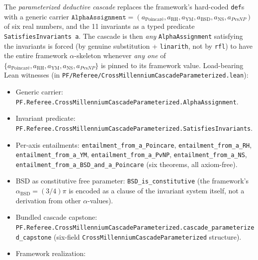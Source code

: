 \begin{definition}
\label{def:cascade-view-parameterized}
The \emph{parameterized deductive cascade} replaces the framework's
hard-coded \texttt{def}s with a generic carrier
$\texttt{AlphaAssignment} = (a_{\text{Poincar\'e}}, a_{\text{RH}},
a_{\text{YM}}, a_{\text{BSD}}, a_{\text{NS}}, a_{P\text{vs}NP})$ of
six real numbers, and the 11 invariants as a typed predicate
\texttt{SatisfiesInvariants a}. The cascade is then \emph{any}
\texttt{AlphaAssignment} satisfying the invariants is forced (by
genuine substitution + \texttt{linarith}, not by \texttt{rfl}) to
have the entire framework $\alpha$-skeleton whenever \emph{any
one} of $\{a_{\text{Poincar\'e}}, a_{\text{RH}}, a_{\text{YM}},
a_{\text{NS}}, a_{P\text{vs}NP}\}$ is pinned to its framework value.
Load-bearing Lean witnesses (in
\texttt{PF/\allowbreak{}Referee/\allowbreak{}Cross\allowbreak{}Millennium\allowbreak{}Cascade\allowbreak{}Parameterized.\allowbreak{}lean}):
\begin{itemize}
\item Generic carrier:
\texttt{PF.\allowbreak{}Referee.\allowbreak{}Cross\allowbreak{}Millennium\allowbreak{}Cascade\allowbreak{}Parameterized.Alpha\allowbreak{}Assignment}.
\item Invariant predicate:
\texttt{PF.\allowbreak{}Referee.\allowbreak{}Cross\allowbreak{}Millennium\allowbreak{}Cascade\allowbreak{}Parameterized.Satisfies\allowbreak{}Invariants}.
\item Per-axis entailments: \texttt{entailment\_from\_a\_Poincare},
\texttt{entailment\_from\_a\_RH}, \texttt{entailment\_from\_a\_YM},
\texttt{entailment\_from\_a\_PvNP},
\texttt{entailment\_from\_a\_NS},
\texttt{entailment\_\allowbreak{}from\_\allowbreak{}a\_\allowbreak{}BSD\_\allowbreak{}and\_\allowbreak{}a\_\allowbreak{}Poincare} (six theorems,
all axiom-free).
\item BSD as constitutive free parameter:
\texttt{BSD\_is\_constitutive} (the framework's
$\alpha_{\text{BSD}} = (3/4)\pi$ is encoded as a clause of the
invariant system itself, not a derivation from other $\alpha$-values).
\item Bundled cascade capstone:
\texttt{PF.\allowbreak{}Referee.\allowbreak{}Cross\allowbreak{}Millennium\allowbreak{}Cascade\allowbreak{}Parameterized.cascade\_\allowbreak{}parameterized\_\allowbreak{}capstone}
(six-field \texttt{Cross\allowbreak{}Millennium\allowbreak{}Cascade\allowbreak{}Parameterized}
structure).
\item Framework realization:

\end{itemize}
\end{definition}
